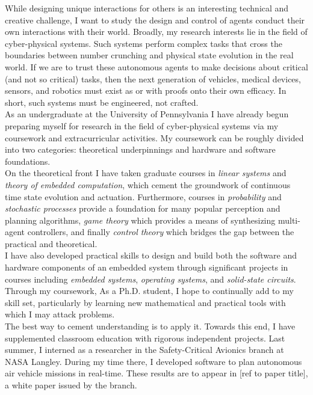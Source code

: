 \documentclass[]{article}
\begin{document}
While designing unique interactions for others is an interesting technical and creative challenge, I want to study the design and control of agents conduct their own interactions with their world. Broadly, my research interests lie in the field of cyber-physical systems. Such systems perform complex tasks that cross the boundaries between number crunching and physical state evolution in the real world. If we are to trust these autonomous agents to make decisions about critical (and not so critical) tasks, then the next generation of vehicles, medical devices, sensors, and robotics must exist as or with proofs onto their own efficacy. In short, such systems must be engineered, not crafted.\\

As an undergraduate at the University of Pennsylvania I have already begun preparing myself for research in the field of cyber-physical systems via my coursework and extracurricular activities. My coursework can be roughly divided into two categories: theoretical underpinnings and hardware and software foundations.\\

On the theoretical front I have taken graduate courses in \textit{linear systems} and \textit{theory of embedded computation}, which cement the groundwork of continuous time state evolution and actuation. Furthermore, courses in \textit{probability} and \textit{stochastic processes} provide a foundation for many popular perception and planning algorithms, \textit{game theory} which provides a means of synthesizing multi-agent controllers, and finally  \textit{control theory} which bridges the gap between the practical and theoretical.\\

I have also developed practical skills to design and build both the software and hardware components of an embedded system through significant projects in courses including \textit{embedded systems}, \textit{operating systems}, and \textit{solid-state circuits}. Through my coursework,  As a Ph.D. student, I hope to continually add to my skill set, particularly by learning new mathematical and practical tools with which I may attack problems.\\

The best way to cement understanding is to apply it. Towards this end, I have supplemented classroom education with rigorous independent projects. Last summer, I interned as a researcher in the Safety-Critical Avionics branch at NASA Langley. During my time there, I developed software to plan autonomous air vehicle missions in real-time. These results are to appear in [ref to paper title], a white paper issued by the branch.\\
\end{document}
